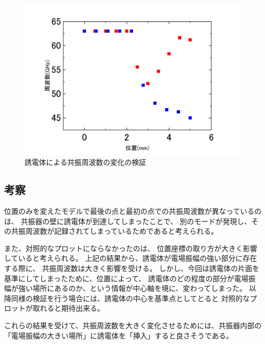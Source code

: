 
\vspace{10 mm}

\begin{figure}[h]
  \begin{center}
    \includegraphics[width=12cm]{./image/plot1.jpg}
    \caption{誘電体による共振周波数の変化の検証}
    \label{fig:Cavity}
  \end{center}
\end{figure}


\subsection*{考察}
位置のみを変えたモデルで最後の点と最初の点での共振周波数が異なっているのは、
共振器の壁に誘電体が到達してしまったことで、
別のモードが発現し、その共振周波数が記録されてしまっているためであると考えられる。

また、対照的なプロットにならなかったのは、
位置座標の取り方が大きく影響していると考えられる。
上記の結果から、誘電体が電場振幅の強い部分に存在する際に、
共振周波数は大きく影響を受ける。
しかし、今回は誘電体の片面を基準にしてしまったために、位置によって、
誘電体のどの程度の部分が電場振幅が強い場所にあるのか、という情報が中心軸を境に、変わってしまった。
以降同様の検証を行う場合には、誘電体の中心を基準点としてとると
対照的なプロットが取れると期待出来る。



これらの結果を受けて、共振周波数を大きく変化させるためには、共振器内部の「電場振幅の大きい場所」に誘電体を「挿入」すると良さそうである。


